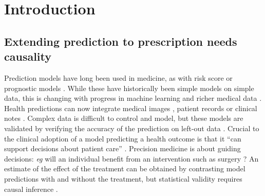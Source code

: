 \documentclass[unnumsec,webpdf,contemporary,large]{oup-authoring-template}%
\theoremstyle{thmstyleone}%
\theoremstyle{thmstyletwo}%
\theoremstyle{thmstylethree}%
\begin{document}
\section{Introduction}

\subsection{Extending prediction to prescription needs causality}

Prediction models have long been used in medicine, as with risk
score or prognostic models \cite{moons2009prognosis,steyerberg2019clinical}.
While these have historically been simple models on simple data, this is
changing with progress in machine learning and richer medical data
\cite{beam2018big,rajkomar2019machine}. Health predictions can now integrate medical images
\cite{khojaste2022deep,zhang2019radiological,yala2019deep,shen2019deep,nassif2022breast},
patient records
\cite{mooney2018bigdata,desai2020comparison,simon2018predicting} or clinical
notes \cite{horng2017creating,wang2020prediction,spasic2020clinical}.
Complex data is difficult to control and model, but these models are
validated by verifying the accuracy of the prediction on left-out data
\cite{altman2009prognosis,poldrack2020establishment,varoquaux2022evaluating}.
Crucial to the clinical adoption of a model predicting a health outcome
is that it ``can support decisions about patient care''
\cite{wyatt1995commentary}. Precision medicine is about
guiding decisions: \emph{eg} will an individual benefit from an intervention such as surgery
\cite{fontana2019can}? An estimate of the effect of the treatment can be
obtained by contrasting model predictions with and without the treatment,
but statistical validity requires causal inference
\cite{snowden_implementation_2011,sperrin2019explicit,blakely2020reflection}.

\end{document}

